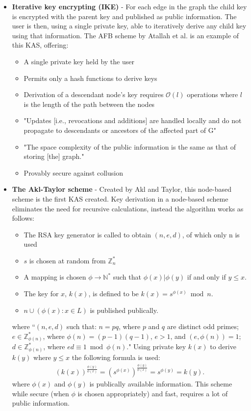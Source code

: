 \documentclass[12pt, titlepage]{article}
\begin{document}
\begin{itemize}
\item \textbf{Iterative key encrypting (IKE)} - For each edge in the graph the child key is encrypted with the parent key and published as public information. The user is then, using a single private key, able to iteratively derive any child key using that information\cite{lazyEncryption}. The AFB scheme by Atallah et al. is an example of this KAS, offering\cite{atallah2005}:
\begin{itemize}
\item A single private key held by the user
\item Permits only a hash functions to derive keys
\item Derivation of a descendant node's key requires $\mathcal{O}(l)$ operations where $l$ is the length of the path between the nodes
\item "Updates [i.e., revocations and additions] are handled locally and do not propagate to descendants or ancestors of the affected part of G"
\item "The space complexity of the public information is the same as that of
storing [the] graph."
\item Provably secure against collusion
\end{itemize}


\item \textbf{The Akl-Taylor scheme} - Created by Akl and Taylor, this node-based scheme is the first KAS created. Key derivation in a node-based scheme eliminates the need for recursive calculations, instead the algorithm works as follows\cite{lazyEncryption}:
\begin{itemize}
\item The RSA key generator is called to obtain $(n, e, d)$, of which only n is used
\item $s$ is chosen at random from $\mathbb{Z}^{*}_{n}$
\item A mapping is chosen $\phi \rightarrow \mathbb{N}^{*}$ such that $\phi(x) | \phi(y)$ if and only if $y≤x$.
\item The key for $x$, $k(x)$, is defined to be $k(x) = s^{ \phi (x)} \bmod n$.
\item ${n} \cup (\phi(x) : x ∈ L)$ is published publically.
\end{itemize}
where ``$(n, e, d)$ such that: $n = pq$, where $p$ and $q$ are distinct odd primes; $e ∈ \mathbb{Z}^{*}_{\phi(n)}$, where $\phi(n) = (p − 1)(q − 1)$, $e > 1$, and $(e, \phi(n)) = 1$; $d ∈ \mathbb{Z}^{*}_{\phi(n)}$, where $ed \equiv 1 \bmod \phi(n)$."
\newline Using private key $k(x)$ to derive $k(y)$ where $y≤x$ the following formula is used:
\begin{align*}
(k(x))^{\frac{\phi(y)}{\phi(x)}} = (s^{\phi(x)})^{\frac{\phi(y)}{\phi(x)}} = s^{\phi(y)} = k(y).
\end{align*}
where $\phi(x)$ and $\phi(y)$ is publically available information.
\newline \indent This scheme while secure (when $\phi$ is chosen appropriately) and fast, requires a lot of public information.
\end{itemize}
\end{document}
